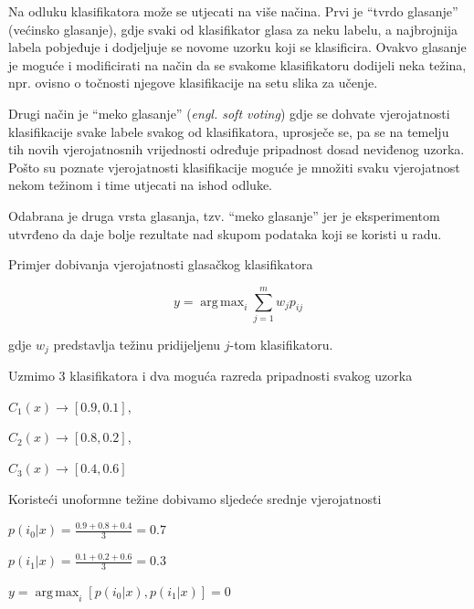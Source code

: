 \documentclass[times, utf8, zavrsni]{fer}
\DeclareMathOperator*{\argmax}{arg\,max}
\begin{document}
\bigbreak

Na odluku klasifikatora može se utjecati
na više načina. Prvi je \enquote{tvrdo glasanje} (većinsko glasanje), gdje
svaki od klasifikator glasa za neku labelu, a najbrojnija labela pobjeđuje 
i dodjeljuje se novome uzorku koji se klasificira. Ovakvo glasanje je moguće i 
modificirati na način da se svakome klasifikatoru dodijeli neka težina, 
npr. ovisno o točnosti njegove klasifikacije na setu slika za učenje.

\bigbreak

Drugi način je \enquote{meko glasanje} (\textit{engl. soft voting}) gdje
se dohvate vjerojatnosti klasifikacije svake labele svakog od klasifikatora,
uprosječe se, pa se na temelju tih novih vjerojatnosnih vrijednosti određuje
pripadnost dosad neviđenog uzorka. Pošto su poznate vjerojatnosti klasifikacije
moguće je množiti svaku vjerojatnost nekom težinom i time utjecati na ishod odluke.

\bigbreak

Odabrana je druga vrsta glasanja, tzv. \enquote{meko glasanje} jer je eksperimentom
utvrđeno da daje bolje rezultate nad skupom podataka koji se koristi u radu.  

\bigbreak

Primjer dobivanja vjerojatnosti glasačkog klasifikatora

\[y = \argmax_i \sum_{j=1}^mw_jp_{ij}\]

gdje \(w_j\) predstavlja težinu pridijeljenu \(j\)-tom klasifikatoru.

\newpage

Uzmimo 3 klasifikatora i dva moguća razreda pripadnosti svakog uzorka 

\begin{center}
\(C_1(x) \rightarrow [0.9,0.1]\),
\end{center}
\begin{center}
\(C_2(x) \rightarrow [0.8,0.2]\),
\end{center}
\begin{center}
\(C_3(x) \rightarrow [0.4,0.6]\)
\end{center}

Koristeći unoformne težine dobivamo sljedeće srednje vjerojatnosti
\begin{center}
\(p(i_0|x)=\frac{0.9+0.8+0.4}{3}=0.7\)

\(p(i_1|x)=\frac{0.1+0.2+0.6}{3}=0.3\)

\(y=\argmax_i [p(i_0|x),p(i_1|x)]=0\)
\end{center}
\end{document}
